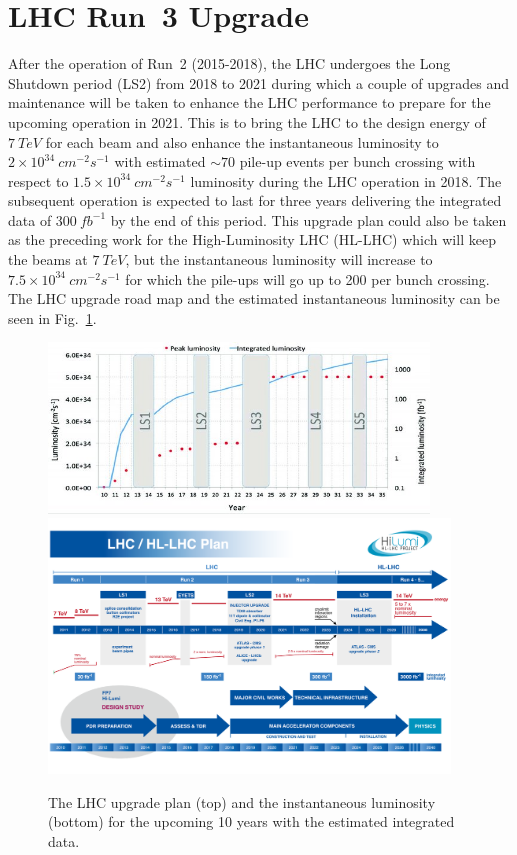 \section{LHC Run~3 Upgrade}
After the operation of Run~2 (2015-2018), the LHC undergoes the Long Shutdown period (LS2) from 2018 to 2021 during which a couple of upgrades and maintenance will be taken to enhance the LHC performance to prepare for the upcoming operation in 2021. This is to bring the LHC to the design energy of $7~TeV$ for each beam and also enhance the instantaneous luminosity to $2\times10^{34}~cm^{-2}s^{-1}$ with estimated $\sim 70$ pile-up events per bunch crossing with respect to $1.5\times10^{34}~cm^{-2}s^{-1}$ luminosity during the LHC operation in 2018. The subsequent operation is expected to last for three years delivering the integrated data of $300~fb^{-1}$ by the end of this period. This upgrade plan could also be taken as the preceding work for the High-Luminosity LHC (HL-LHC) which will keep the beams at $7~TeV$, but the instantaneous luminosity will increase to $7.5\times10^{34}~cm^{-2}s^{-1}$ for which the pile-ups will go up to 200 per bunch crossing. The LHC upgrade road map and the estimated instantaneous luminosity can be seen in Fig.~\ref{Fig:LHC_upgrade}.
\begin{figure}[!h]                
	\includegraphics[width=0.9\textwidth]{Chapter6/The-LHC-upgrade-schedule-and-associated-luminosity.jpg}
	\includegraphics[width=0.95\textwidth]{Chapter6/Schedule_HL.png}
	\begin{center}
		\caption{The LHC upgrade plan (top)\cite{schedule} and the instantaneous luminosity (bottom)\cite{Atlas:2019qfx} for the upcoming 10 years with the estimated integrated data.}
		\label{Fig:LHC_upgrade}            
	\end{center}
\end{figure} 
